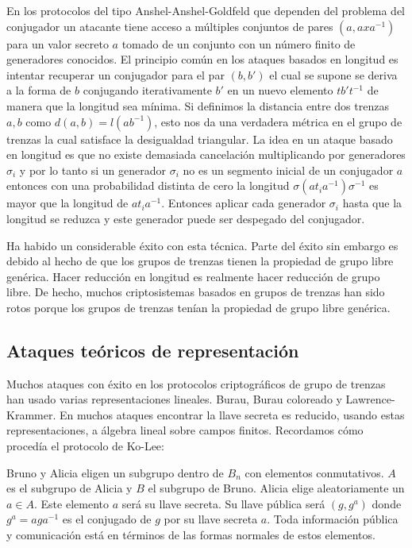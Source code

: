 \documentclass[12pt]{book}
\theoremstyle{definition}
\begin{document}
En los protocolos del tipo Anshel-Anshel-Goldfeld que dependen del problema del conjugador un atacante tiene acceso a múltiples conjuntos de pares $(a,axa^{-1})$ para un valor secreto $a$ tomado de un conjunto con un número finito de generadores conocidos. El principio común en los ataques basados en longitud es intentar recuperar un conjugador para el par $(b,b')$ el cual se supone se deriva a la forma de $b$ conjugando iterativamente $b'$ en un nuevo elemento $tb't^{-1}$ de manera que la longitud sea mínima. Si definimos la distancia entre dos trenzas $a,b$ como $d(a,b)=l(ab^{-1})$, esto nos da una verdadera métrica en el grupo de trenzas la cual satisface la desigualdad triangular. La idea en un ataque basado en longitud es que no existe demasiada cancelación multiplicando por generadores $\sigma_i$ y por lo tanto si un generador $\sigma_i$ no es un segmento inicial de un conjugador $a$ entonces con una probabilidad distinta de cero la longitud $\sigma(at_ia^{-1})\sigma^{-1}$ es mayor que la longitud de $at_ia^{-1}$. Entonces aplicar cada generador $\sigma_i$ hasta que la longitud se reduzca y este generador puede ser despegado del conjugador.

Ha habido un considerable éxito con esta técnica. Parte del éxito sin embargo es debido al hecho de que los grupos de trenzas tienen la propiedad de grupo libre genérica. Hacer reducción en longitud es realmente hacer reducción de grupo libre. De hecho, muchos criptosistemas basados en grupos de trenzas han sido rotos porque los grupos de trenzas tenían la propiedad de grupo libre genérica.

\subsection{Ataques teóricos de representación}
Muchos ataques con éxito en los protocolos criptográficos de grupo de trenzas han usado varias representaciones lineales. Burau, Burau coloreado y Lawrence-Krammer. En muchos ataques encontrar la llave secreta es reducido, usando estas representaciones, a álgebra lineal sobre campos finitos. Recordamos cómo procedía el protocolo de Ko-Lee:

Bruno y Alicia eligen un subgrupo dentro de $B_n$ con elementos conmutativos. $A$ es el subgrupo de Alicia y $B$ el subgrupo de Bruno. Alicia elige aleatoriamente un $a\in A$. Este elemento $a$ será su llave secreta. Su llave pública será $(g,g^a)$ donde $g^a=aga^{-1}$ es el conjugado de $g$ por su llave secreta $a$. Toda información pública y comunicación está en términos de las formas normales de estos elementos.
\end{document}
